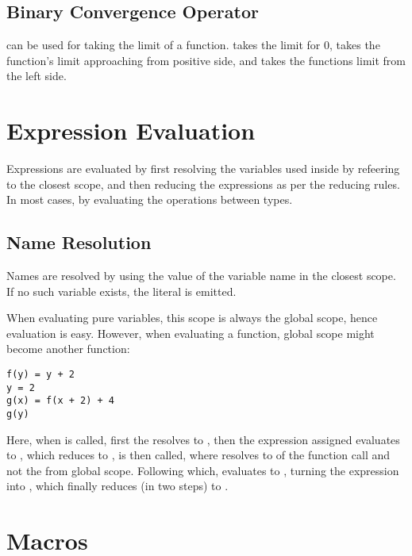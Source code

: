 \documentclass[11pt,a4paper]{book}
\begin{document}
\subsection{Binary Convergence Operator \code{->}}

\code{->} can be used for taking the limit of a function.  takes the limit for 0,  takes the function's limit approaching from positive side, and  takes the functions limit from the left side.

\section{Expression Evaluation}

Expressions are evaluated by first resolving the variables used inside by refeering to the closest scope, and then reducing the expressions as per the reducing rules. In most cases, by evaluating the operations between types. \\

\subsection{Name Resolution}

Names are resolved by using the value of the variable name in the closest scope. If no such variable exists, the  literal is emitted.

When evaluating pure variables, this scope is always the global scope, hence evaluation is easy. However, when evaluating a function, global scope might become another function:

\begin{lstlisting}
f(y) = y + 2
y = 2
g(x) = f(x + 2) + 4
g(y)
\end{lstlisting}

Here, when  is called, first the  resolves to , then the expression assigned evaluates to , which reduces to ,  is then called, where  resolves to  of the function call and not the  from global scope. Following which,  evaluates to , turning the expression into , which finally reduces (in two steps) to .

\section{Macros}
\end{document}
